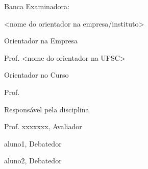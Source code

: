 
%
% 
%
\begin{folhadeaprovacao}


\thispagestyle{empty}

{\large Banca Examinadora:}

\vspace{1.3cm}

\begin{flushright}

{\large <nome do orientador na empresa/instituto>}

{\large Orientador na Empresa}

\vspace{1.2cm}
{\large Prof. <nome do orientador na UFSC>}

{\large Orientador no Curso}

\vspace{1.2cm}
 
{\large Prof. }

{\large Responsável pela disciplina}

\vspace{1cm}

{\large Prof. xxxxxxx, Avaliador}

\vspace{0.8cm}

{\large aluno1, Debatedor}

\vspace{0.8cm}

{\large aluno2, Debatedor}

\end{flushright}
  
\end{folhadeaprovacao}